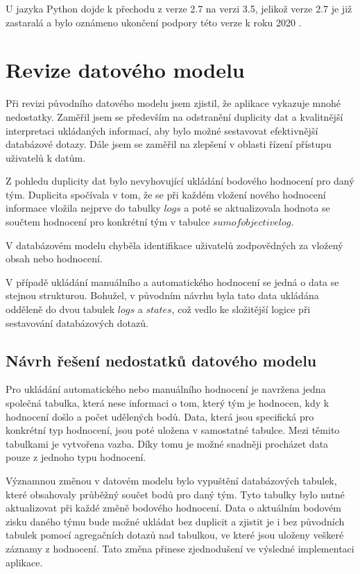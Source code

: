 \documentclass[
  digital, %
  twoside, %
  table,   %
  nolof,     %
  nolot,     %
]{fithesis3}
\begin{document}
U jazyka Python dojde k přechodu z verze 2.7 na verzi 3.5, jelikož verze 2.7 je již zastaralá a bylo oznámeno ukončení podpory této verze k roku 2020 \cite{python27}.


\section{Revize datového modelu}

Při revizi původního datového modelu jsem zjistil, že aplikace vykazuje mnohé nedostatky. Zaměřil jsem se především na odstranění duplicity dat a kvalitnější interpretaci ukládaných informací, aby bylo možné sestavovat efektivnější databázové dotazy. Dále jsem se zaměřil na zlepšení v oblasti řízení přístupu uživatelů k datům.

Z pohledu duplicity dat bylo nevyhovující ukládání bodového hodnocení pro daný tým. Duplicita spočívala v tom, že se při každém vložení nového hodnocení informace vložila nejprve do tabulky $logs$ a poté se aktualizovala hodnota se součtem hodnocení pro konkrétní tým v tabulce $sumofobjectivelog$.

V databázovém modelu chyběla identifikace uživatelů zodpovědných za vložený obsah nebo hodnocení. 

V případě ukládání manuálního a automatického hodnocení se jedná o data se stejnou strukturou. Bohužel, v původním návrhu byla tato data ukládána odděleně do dvou tabulek $logs$ a $states$, což vedlo ke složitější logice při sestavování databázových dotazů.

\subsection{Návrh řešení nedostatků datového modelu}
Pro ukládání automatického nebo manuálního hodnocení je navržena jedna společná tabulka, která nese informaci o tom, který tým je hodnocen, kdy k hodnocení došlo a počet udělených bodů. Data, která jsou specifická pro konkrétní typ hodnocení, jsou poté uložena v samostatné tabulce. Mezi těmito tabulkami je vytvořena vazba. Díky tomu je možné snadněji procházet data pouze z jednoho typu hodnocení.

Významnou změnou v datovém modelu bylo vypuštění databázových tabulek, které obsahovaly průběžný součet bodů pro daný tým. Tyto tabulky bylo nutné aktualizovat při každé změně bodového hodnocení. Data o aktuálním bodovém zisku daného týmu bude možné ukládat bez duplicit a zjistit je i bez původních tabulek pomocí agregačních dotazů nad tabulkou, ve které jsou uloženy veškeré záznamy z hodnocení. Tato změna přinese zjednodušení ve výsledné implementaci aplikace.
\end{document}
